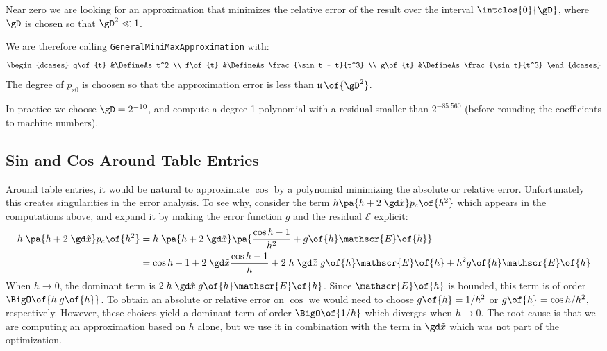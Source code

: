\documentclass[10pt, a4paper, twoside]{basestyle}
\DeclareMathOperator{\ULP}{\mathfrak u}
\newcommand{\red}[1]{\tilde{#1}}
\begin{document}
Near zero we are looking for an approximation that minimizes the relative error of the result over the interval $\intclos{0}{\gD}$, where $\gD$ is chosen so that $\gD^2 \ll 1$.

We are therefore calling \texttt{GeneralMiniMaxApproximation} with:
\[
\begin{dcases}
q\of{t} &\DefineAs t^2 \\
f\of{t} &\DefineAs \frac{\sin t - t}{t^3} \\
g\of{t} &\DefineAs \frac{\sin t}{t^3}
\end{dcases}
\]
The degree of $p_{s0}$ is choosen so that the approximation error is less than $\ULP\of{\gD^2}$.

In practice we choose $\gD = 2^{-10}$, and compute a degree-1 polynomial with a residual smaller than $2^{-85.560}$ (before rounding the coefficients to machine numbers).

\subsection*{Sin and Cos Around Table Entries}

Around table entries, it would be natural to approximate $\cos$ by a polynomial minimizing the absolute or relative error.  Unfortunately this creates singularities in the error analysis.  To see why, consider the term $h \pa{h + 2 \; \gd \red x} p_c\of{h^2}$ which appears in the computations above, and expand it by making the error function $g$ and the residual $\mathscr{E}$ explicit:
\begin{align*}
h \; \pa{h + 2 \; \gd \red x} p_c\of{h^2} &= h \; \pa{h + 2 \; \gd \red x} \pa{\frac{\cos h - 1}{h^2} + g\of{h} \mathscr{E}\of{h}} \\
&= \cos h - 1 + 2 \; \gd \red x \frac{\cos h - 1}{h} + 2 \; h \; \gd \red x \; g\of{h} \mathscr{E}\of{h} + h^2 g\of{h} \mathscr{E}\of{h}
\end{align*}
When $h \to 0$, the dominant term is $2 \; h \; \gd \red x \; g\of{h} \mathscr{E}\of{h}$.  Since $\mathscr{E}\of{h}$ is bounded, this term is of order $\BigO\of{h \; g\of{h}}$.  To obtain an absolute or relative error on $\cos$ we would need to choose $g\of{h} = 1/h^2$ or $g\of{h} = \cos h/h^2$, respectively.  However, these choices yield a dominant term of order $\BigO\of{1/h}$ which diverges when $h \to 0$.  The root cause is that we are computing an approximation based on $h$ alone, but we use it in combination with the term in $\gd \red x$ which was not part of the optimization.
\end{document}
